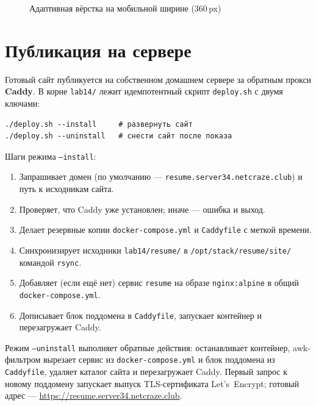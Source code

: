 \begin{figure}[h]
  \centering
  \caption{Адаптивная вёрстка на мобильной ширине (\(360\,\)px)}
  \label{fig:mobile}
\end{figure}

\section{Публикация на сервере}

Готовый сайт публикуется на собственном домашнем сервере за обратным прокси
\textbf{Caddy}. В корне \texttt{lab14/} лежит идемпотентный скрипт
\texttt{deploy.sh} с двумя ключами:

\begin{lstlisting}[caption={Запуск деплоя и сноса сайта},captionpos=b]
./deploy.sh --install     # развернуть сайт
./deploy.sh --uninstall   # снести сайт после показа
\end{lstlisting}

Шаги режима \texttt{--install}:
\begin{enumerate}
  \item Запрашивает домен (по умолчанию ---
        \texttt{resume.server34.netcraze.club}) и путь к исходникам сайта.
  \item Проверяет, что Caddy уже установлен; иначе --- ошибка и выход.
  \item Делает резервные копии \texttt{docker-compose.yml} и
        \texttt{Caddyfile} с меткой времени.
  \item Синхронизирует исходники \texttt{lab14/resume/} в
        \texttt{/opt/stack/resume/site/} командой \texttt{rsync}.
  \item Добавляет (если ещё нет) сервис \texttt{resume} на образе
        \texttt{nginx:alpine} в общий \texttt{docker-compose.yml}.
  \item Дописывает блок поддомена в \texttt{Caddyfile}, запускает контейнер
        и перезагружает Caddy.
\end{enumerate}

Режим \texttt{--uninstall} выполняет обратные действия: останавливает
контейнер, awk-фильтром вырезает сервис из \texttt{docker-compose.yml} и блок
поддомена из \texttt{Caddyfile}, удаляет каталог сайта и перезагружает Caddy.
Первый запрос к новому поддомену запускает выпуск TLS-сертификата
Let's~Encrypt; готовый адрес --- \url{https://resume.server34.netcraze.club}.

